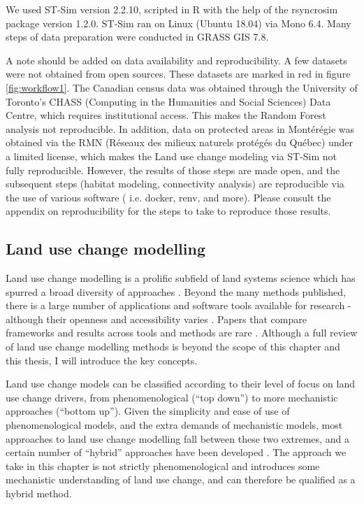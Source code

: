 We used ST-Sim version 2.2.10, scripted in R with the help of the rsyncrosim package version 1.2.0. ST-Sim ran on Linux (Ubuntu 18.04) via Mono 6.4. Many steps of data preparation were conducted in GRASS GIS 7.8.

A note should be added on data availability and reproducibility. A few datasets were not obtained from open sources. These datasets are marked in red in figure \ref{fig:workflow1}. The Canadian census data was obtained through the University of Toronto's CHASS (Computing in the Humanities and Social Sciences) Data Centre, which requires institutional access. This makes the Random Forest analysis not reproducible. In addition, data on protected areas in Montérégie was obtained  via the RMN (Réseaux des milieux naturels protégés du Québec) under a limited license, which makes the Land use change modeling via ST-Sim not fully reproducible. However, the results of those steps are made open, and the subsequent steps (habitat modeling, connectivity analysis) are reproducible via the use of various software ( i.e. docker, renv, and more). Please consult the appendix on reproducibility for the steps to take to reproduce those results. \\ %

\subsection{Land use change modelling}
Land use change modelling is a prolific subfield of land systems science which has spurred a broad diversity of approaches \citep{dang_review_2016, noszczyk_review_2018}. Beyond the many methods published, there is a large number of applications and software tools available for research - although their openness and accessibility varies \citep{moulds_open_2015}. Papers that compare frameworks and results across tools and methods are rare \citep{pontius_comparing_2008, pontius_comparison_2005, sun_comparison_2018}. Although a full review of land use change modelling methods is beyond the scope of this chapter and this thesis, I will introduce the key concepts.

Land use change models can be classified according to their level of focus on land use change drivers, from phenomenological (“top down”) to more mechanistic approaches (“bottom up”). Given the simplicity and ease of use of phenomenological models, and the extra demands of mechanistic models, most approaches to land use change modelling fall between these two extremes, and a certain number of “hybrid” approaches have been developed \citep{sun_comparison_2018, jokar_arsanjani_integration_2013}. The approach we take in this chapter is not strictly phenomenological and introduces some mechanistic understanding of land use change, and can therefore be qualified as a hybrid method.

